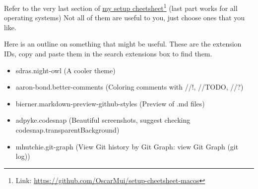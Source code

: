 Refer to the very last section of \href{https://github.com/OscarMui/setup-cheetsheet-macos}{my setup cheetsheet}\footnote{Link: \url{https://github.com/OscarMui/setup-cheetsheet-macos}} (last part works for all operating systems) Not all of them are useful to you, just choose ones that you like.

Here is an outline on something that might be useful. These are the extension IDs, copy and paste them in the search extensions box to find them.

\begin{itemize}
    \item sdras.night-owl (A cooler theme)
    \item aaron-bond.better-comments (Coloring comments with //!, //TODO, //?)
    \item bierner.markdown-preview-github-styles (Preview of .md files) 
    \item adpyke.codesnap (Beautiful screenshots, suggest checking codesnap.transparentBackground)
    \item mhutchie.git-graph (View Git history by Git Graph: view Git Graph (git log))
\end{itemize}
